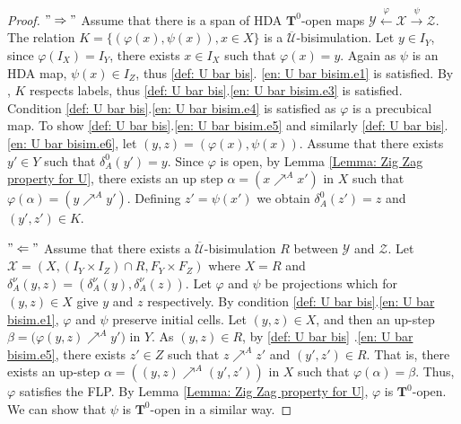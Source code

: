 \documentclass[11pt,a4paper,oldfontcommands]{memoir}
\newcommand{\TrO}{\mathbf{T}}
\begin{document}
\begin{proof}
    $"\Rightarrow"$ Assume that there is a span of HDA $\TrO^0$-open maps $\mathcal{Y} \stackrel{\varphi}{\longleftarrow} \mathcal{X} \stackrel{\psi}{\longrightarrow} \mathcal{Z}$. 
    The relation $K=\{ (\varphi(x), \psi(x)) , x \in X \}$ is a $\overline{\mathcal{U}}$-bisimulation. Let $y \in I_Y$, since $\varphi(I_X)=I_Y$, there exists $x\in I_X$ such that $\varphi(x)=y$. Again as $\psi$ is an HDA map, $\psi(x)\in I_Z$, thus \ref{def: U bar bis}. \ref{en: U bar bisim.e1} is satisfied. By \cite[Lemma 27]{LanguageofHDA}, $K$ respects labels, thus \ref{def: U bar bis}.\ref{en: U bar bisim.e3} is satisfied. 
    Condition \ref{def: U bar bis}.\ref{en: U bar bisim.e4} is satisfied as $\varphi$ is a precubical map. To show \ref{def: U bar bis}.\ref{en: U bar bisim.e5} and similarly \ref{def: U bar bis}.\ref{en: U bar bisim.e6}, let  $(y,z)=(\varphi(x),\psi(x))$. Assume that there exists $y' \in Y$ such that $\delta_A^0(y')=y$. Since $\varphi$ is open, by Lemma \ref{Lemma: Zig Zag property for U}, there exists an up step $\alpha=(x \nearrow^A x')$ in $ X$ such that $\varphi(\alpha)=(y \nearrow^A y')$. Defining $z'=\psi(x')$ we obtain $\delta_A^0(z')=z$ and $(y',z') \in K$.

    
        $"\Leftarrow"$ Assume that there exists a $\overline{\mathcal{U}}$-bisimulation $R$ between $\mathcal{Y}$ and $\mathcal{Z}$. Let $\mathcal{X}=(X,(I_Y \times I_Z)\cap R, F_Y \times F_Z)$ where $X=R$ and $\delta_A^{\nu}(y,z)=(\delta_A^{\nu}(y),\delta_A^{\nu}(z))$. Let $\varphi$ and $\psi$ be projections which for $(y,z) \in X$ give $y$ and $z$ respectively. By condition \ref{def: U bar bis}.\ref{en: U bar bisim.e1}, $\varphi$ and $\psi$ preserve initial cells.  Let $(y,z)\in X$, and then an up-step $\beta=\bigl(\varphi(y,z) \nearrow^A y'\bigl)$ in $Y$. %
        As $(y,z) \in R$, by \ref{def: U bar bis} .\ref{en: U bar bisim.e5}, there exists $z' \in Z$ such that $z \nearrow^A z'$ and $(y',z') \in R$. That is, there exists an up-step $\alpha=((y,z) \nearrow^A (y',z'))$ in $X$ such that $\varphi(\alpha)=\beta$. Thus, $\varphi$ satisfies the FLP. By Lemma \ref{Lemma: Zig Zag property for U}, $\varphi$ is $\TrO^0$-open. We can show that $\psi$ is $\TrO^0$-open in a similar way.
        \end{proof}
\end{document}
